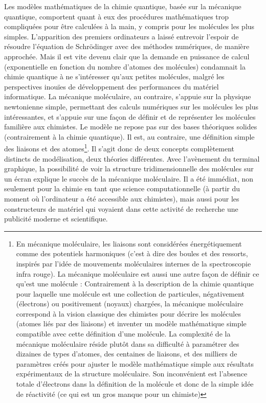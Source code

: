 \documentclass{FramateX}
\begin{document}
\begin{refsection}
Les modèles mathématiques de la chimie quantique, basée sur la mécanique
quantique, comportent quant à eux des procédures mathématiques trop
compliquées pour être calculées à la main, y compris pour les molécules
les plus simples. L'apparition des premiers
ordinateurs a laissé entrevoir l'espoir de résoudre
l'équation de Schrödinger avec des méthodes
numériques, de manière approchée. Mais il est vite devenu clair que la
demande en puissance de calcul (exponentielle en fonction du nombre
d'atomes des molécules) condamnait la chimie quantique
à ne s'intéresser qu'aux petites
molécules, malgré les perspectives inouïes de développement des
performances du matériel informatique. La mécanique moléculaire, au
contraire, s'appuie sur la physique newtonienne
simple, permettant des calculs numériques sur les molécules les plus
intéressantes, et s'appuie sur une façon de définir et
de représenter les molécules familière aux chimistes. Le modèle ne
repose pas sur des bases théoriques solides (contrairement à la chimie
quantique). Il est, au contraire, une définition simple des liaisons et
des atomes\footnote{En mécanique moléculaire, les liaisons sont
considérées énergétiquement comme des potentiels harmoniques
(c'est à dire des boules et des ressorts, inspirés par
l'idée de mouvements moléculaires internes de la
spectroscopie infra rouge). La mécanique moléculaire est aussi une
autre façon de définir ce qu'est une molécule :
Contrairement à la description de la chimie quantique pour laquelle une
molécule est une collection de particules, négativement (électrons) ou
positivement (noyaux) chargées, la mécanique moléculaire correspond à
la vision classique des chimistes pour décrire les molécules (atomes
liés par des liaisons) et inventer un modèle mathématique simple
compatible avec cette définition d'une molécule. La
complexité de la mécanique moléculaire réside plutôt dans sa difficulté
à paramétrer des dizaines de types d'atomes, des
centaines de liaisons, et des milliers de paramètres créés pour ajuster
le modèle mathématique simple aux résultats expérimentaux de la
structure moléculaire. Son inconvénient est l'absence
totale d'électrons dans la définition de la molécule
et donc de la simple idée de réactivité (ce qui est un gros manque pour
un chimiste)}. Il s'agit donc de deux concepts
complètement distincts de modélisation, deux théories différentes. Avec
l'avènement du terminal graphique, la possibilité de
voir la structure tridimensionnelle des molécules sur un écran explique
le succès de la mécanique moléculaire. Il a été immédiat, non seulement
pour la chimie en tant que science computationnelle (à partir du moment
où l'ordinateur a été accessible aux chimistes), mais
aussi pour les constructeurs de matériel qui voyaient dans cette
activité de recherche une publicité moderne et scientifique.


\end{refsection}
\end{document}
